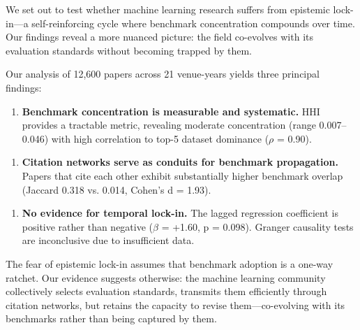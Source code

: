 
We set out to test whether machine learning research suffers from epistemic lock-in---a self-reinforcing cycle where benchmark concentration compounds over time. Our findings reveal a more nuanced picture: the field co-evolves with its evaluation standards without becoming trapped by them.

Our analysis of 12,600 papers across 21 venue-years yields three principal findings:

\begin{enumerate}
\item \textbf{Benchmark concentration is measurable and systematic.} HHI provides a tractable metric, revealing moderate concentration (range 0.007--0.046) with high correlation to top-5 dataset dominance ($\rho$ = 0.90).
\end{enumerate}

\begin{enumerate}
\item \textbf{Citation networks serve as conduits for benchmark propagation.} Papers that cite each other exhibit substantially higher benchmark overlap (Jaccard 0.318 vs. 0.014, Cohen's d = 1.93).
\end{enumerate}

\begin{enumerate}
\item \textbf{No evidence for temporal lock-in.} The lagged regression coefficient is positive rather than negative ($\beta$ = +1.60, p = 0.098). Granger causality tests are inconclusive due to insufficient data.
\end{enumerate}

The fear of epistemic lock-in assumes that benchmark adoption is a one-way ratchet. Our evidence suggests otherwise: the machine learning community collectively selects evaluation standards, transmits them efficiently through citation networks, but retains the capacity to revise them---co-evolving with its benchmarks rather than being captured by them.

